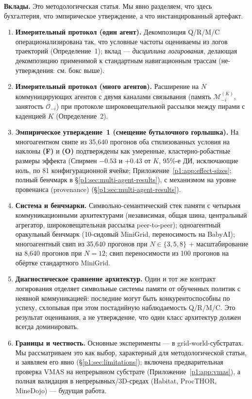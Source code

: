 \documentclass{article}
\begin{document}
\textbf{Вклады.} Это методологическая статья. Мы явно разделяем, что здесь бухгалтерия, что эмпирическое утверждение, а что инстанцированный артефакт.
\begin{enumerate}[leftmargin=20pt,itemsep=2pt,topsep=2pt]
\item \textbf{Измерительный протокол (один агент).} Декомпозиция Q/R/M/C операционализирована так, что условные частоты оцениваемы из логов траекторий (Определение~1); вклад --- \emph{дисциплина логирования}, делающая декомпозицию применимой к стандартным навигационным трассам (не-утверждения: см. бокс выше).

\item \textbf{Измерительный протокол (много агентов).} Расширение на $N$ коммуницирующих агентов с двумя каналами связывания (память $\mathcal{M}_{-i}^{(K)}$, занятость $\mathcal{O}_{-i}$) при протоколе широковещательной рассылки между пирами с каденцией $K$ (Определение~2).

\item \textbf{Эмпирическое утверждение~1 (смещение бутылочного горлышка).} На многоагентном свипе из 35{,}640 прогонов оба стилизованных условия на наклоны \textbf{(F)} и \textbf{(O)} подтверждены как умеренные, кластерно-робастные размеры эффекта (Спирмен $-0.53$ и $+0.43$ от $K$, 95\%-е ДИ, исключающие ноль, по 81 конфигурационной ячейке; Приложение~\ref{p1:app:effect-sizes}; полный бенчмарк в \S\ref{p1:sec:multi-agent-results}), с механизмом на уровне провенанса (provenance) (\S\ref{p1:sec:multi-agent-results}).

\item \textbf{Система и бенчмарки.} Символьно-семантический стек памяти с четырьмя коммуникационными архитектурами (независимая, общая шина, центральный агрегатор, широковещательная рассылка peer-to-peer); одноагентный оракульный бенчмарк (10-сидовый MiniGrid, переносимость на BabyAI); многоагентный свип из 35{,}640 прогонов при $N\!\in\!\{3,5,8\}$ + масштабирование на 8{,}640 прогонов при $N\!=\!12$; свип переносимости из 100 прогонов на обёртке стандартного MiniGrid.

\item \textbf{Диагностическое сравнение архитектур.} Один и тот же контракт логирования отделяет символьные системы памяти от обученных политик с неявной коммуникацией: последние могут быть конкурентоспособны по успеху, схлопывая при этом постадийную наблюдаемость Q/R/M/C. Это результат оценивания, а не утверждение, что один класс архитектур должен всегда доминировать.

\item \textbf{Границы и честность.} Основные эксперименты --- в grid-world-субстратах. Мы рассматриваем это как выбор, характерный для методологической статьи, и заявляем его явно (\S\ref{p1:sec:limitations}); включена предварительная проверка VMAS на непрерывном субстрате (Приложение~\ref{p1:app:vmas}), а полная валидация в непрерывных/3D-средах (Habitat, ProcTHOR, MineDojo) --- будущая работа.
\end{enumerate}
\end{document}

